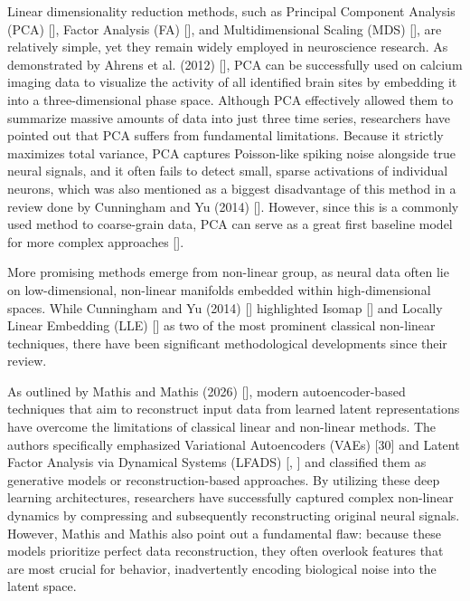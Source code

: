 \documentclass{article}
\begin{document}
Linear dimensionality reduction methods, such as Principal Component Analysis (PCA) [\cite{pearson1901liii}], Factor Analysis (FA) [\cite{spearman1961general}], and Multidimensional Scaling (MDS) [\cite{kruskal1964multidimensional}], are relatively simple, yet they remain widely employed in neuroscience research. As demonstrated by Ahrens et al. (2012) [\cite{ahrens2012brain}], PCA can be successfully used on calcium imaging data to visualize the activity of all identified brain sites by embedding it into a three-dimensional phase space. Although PCA effectively allowed them to summarize massive amounts of data into just three time series, researchers have pointed out that PCA suffers from fundamental limitations. Because it strictly maximizes total variance, PCA captures Poisson-like spiking noise alongside true neural signals, and it often fails to detect small, sparse activations of individual neurons, which was also mentioned as a biggest disadvantage of this method in a review done by Cunningham and Yu (2014) [\cite{cunningham2014dimensionality}]. However, since this is a commonly used method to coarse-grain data, PCA can serve as a great first baseline model for more complex approaches [\cite{kumar2023bunddle}]. 


More promising methods emerge from non-linear group, as neural data often lie on low-dimensional, non-linear manifolds embedded within high-dimensional spaces. While Cunningham and Yu (2014) [\cite{cunningham2014dimensionality}] highlighted Isomap [\cite{tenenbaum2000global}] and Locally Linear Embedding (LLE) [\cite{roweis2000nonlinear}] as two of the most prominent classical non-linear techniques, there have been significant methodological developments since their review.

As outlined by Mathis and Mathis (2026) [\cite{mathis2026joint}], modern autoencoder-based techniques that aim to reconstruct input data from learned latent representations have overcome the limitations of classical linear and non-linear methods. The authors specifically emphasized Variational Autoencoders (VAEs) [30] and Latent Factor Analysis via Dynamical Systems (LFADS) [\cite{pandarinath2018inferring}, \cite{keshtkaran2022large}] and classified them as generative models or reconstruction-based approaches. By utilizing these deep learning architectures, researchers have successfully captured complex non-linear dynamics by compressing and subsequently reconstructing original neural signals. However, Mathis and Mathis also point out a fundamental flaw: because these models prioritize perfect data reconstruction, they often overlook features that are most crucial for behavior, inadvertently encoding biological noise into the latent space.
\end{document}
